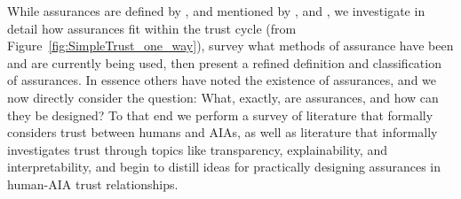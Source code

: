     While assurances are defined by \citeauthor{Lillard2016-yg}, and mentioned by \citeauthor{McKnight2001-fa}, and \citeauthor{Corritore2003-gx}, we investigate in detail how assurances fit within the trust cycle (from Figure~\ref{fig:SimpleTrust_one_way}), survey what methods of assurance have been and are currently being used, then present a refined definition and classification of assurances. In essence others have noted the existence of assurances, and we now directly consider the question: What, exactly, are assurances, and how can they be designed? To that end we perform a survey of literature that formally considers trust between humans and AIAs, as well as literature that informally investigates trust through topics like transparency, explainability, and interpretability, and begin to distill ideas for practically designing assurances in human-AIA trust relationships.





